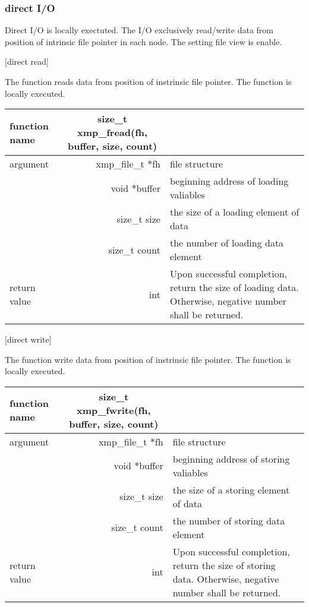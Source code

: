    \subsubsection{direct I/O}

   Direct I/O is locally exectuted. The I/O exclusively read/write data
   from position of intrinsic file pointer in each node.
   The setting file view is enable.

   [direct read]

   The function reads data from position of instrinsic file
   pointer.
   The function is locally executed.

   \begin{table}[h]
    \begin{center}
     \begin{tabular}{l|r|p{70mm}}
      \hline
      {\bf function name}  & \multicolumn{1}{c}{\bf size\_t
      xmp\_fread(fh, buffer, size, count)} &  \\ \hline
      argument & xmp\_file\_t $*$fh & file structure \\ \cline{2-3}
      & void $*$buffer & beginning address of loading valiables \\ \cline{2-3}
      & size\_t size & the size of a loading element of data \\ \cline{2-3}
      & size\_t count & the number of loading data element \\ \hline
      return value & int & Upon successful completion, return the size
	      of loading data. Otherwise, negative number shall be
	      returned. \\ \hline
      \end{tabular}
     \end{center}
    \label{tb:aaa}
   \end{table}

   [direct write]

   The function write data from position of instrinsic file
   pointer.
   The function is locally executed.

   \begin{table}[h]
    \begin{center}
     \begin{tabular}{l|r|p{70mm}}
      \hline
      {\bf function name}  & \multicolumn{1}{c}{\bf size\_t
      xmp\_fwrite(fh, buffer, size, count)} &  \\ \hline
      argument & xmp\_file\_t $*$fh & file structure \\ \cline{2-3}
      & void $*$buffer & beginning address of storing valiables \\ \cline{2-3}
      & size\_t size & the size of a storing element of data \\ \cline{2-3}
      & size\_t count & the number of storing data element \\ \hline
      return value & int & Upon successful completion, return the size
	      of storing data. Otherwise, negative number shall be
	      returned. \\ \hline
      \end{tabular}
     \end{center}
    \label{tb:aaa}
   \end{table}

   
